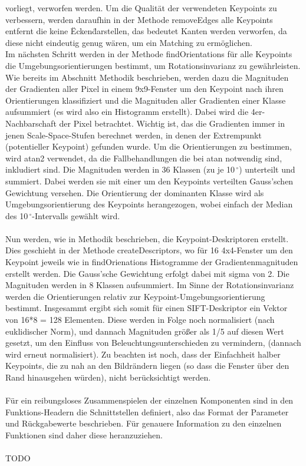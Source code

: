 \documentclass[deutsch]{scrartcl}
\begin{document}
vorliegt, verworfen werden. Um die Qualität der verwendeten Keypoints zu
verbessern, werden daraufhin in der Methode removeEdges alle Keypoints
entfernt die keine \"Ecken\" darstellen, das bedeutet Kanten werden
verworfen, da diese nicht eindeutig genug wären, um ein Matching zu
ermöglichen.\\
Im nächsten Schritt werden in der Methode findOrientations für alle Keypoints die Umgebungsorientierungen bestimmt, um Rotationsinvarianz zu gewährleisten. Wie bereits im Abschnitt Methodik beschrieben, werden dazu die Magnituden der Gradienten aller Pixel in einem 9x9-Fenster um den Keypoint nach ihren Orientierungen klassifiziert und die Magnituden aller Gradienten einer Klasse aufsummiert (es wird also ein Histogramm erstellt). Dabei wird die 4er-Nachbarschaft der Pixel betrachtet. Wichtig ist, das die Gradienten immer in jenen Scale-Space-Stufen berechnet werden, in denen der Extrempunkt (potentieller Keypoint) gefunden wurde. Um die Orientierungen zu bestimmen, wird atan2 verwendet, da die Fallbehandlungen die bei atan notwendig sind, inkludiert sind. Die Magnituden werden in 36 Klassen (zu je 10$\,^{\circ}$) unterteilt und summiert. Dabei werden sie mit einer um den Keypoints verteilten Gauss'schen Gewichtung versehen. Die Orientierung der dominanten Klasse wird als Umgebungsorientierung des Keypoints herangezogen, wobei einfach der Median des 10$\,^{\circ}$-Intervalls gewählt wird.\cite{lowe04} \\\\
Nun werden, wie in Methodik beschrieben, die Keypoint-Deskriptoren erstellt. Dies geschieht in der Methode createDescriptors, wo für 16 4x4-Fenster um den Keypoint jeweils wie in findOrienations Histogramme der Gradientenmagnituden erstellt werden. Die Gauss'sche Gewichtung erfolgt dabei mit sigma von 2. Die Magnituden werden in 8 Klassen aufsummiert. Im Sinne der Rotationsinvarianz werden die Orientierungen relativ zur Keypoint-Umgebungsorientierung bestimmt. Insgesammt ergibt sich somit für einen SIFT-Deskriptor ein Vektor von 16*8 = 128 Elementen. Diese werden in Folge noch normalisiert (nach euklidischer Norm), und dannach Magnituden größer als 1/5 auf diesen Wert gesetzt, um den Einfluss von Beleuchtungsunterschieden zu vermindern, (dannach wird erneut normalisiert). Zu beachten ist noch, dass der Einfachheit halber Keypoints, die zu nah an den Bildrändern liegen (so dass die Fenster über den Rand hinausgehen würden), nicht berücksichtigt werden.\\\\
Für ein reibungsloses Zusammenspielen der einzelnen Komponenten sind in den Funktions-Headern die Schnittstellen definiert, also das Format der Parameter und Rückgabewerte beschrieben. Für genauere Information zu den einzelnen Funktionen sind daher diese heranzuziehen.\\\\
TODO\\
\end{document}
